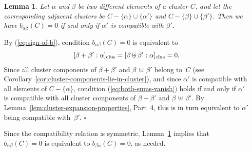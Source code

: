 \documentclass[letterpaper]{amsart}
\numberwithin{equation}{section}
\newtheorem{lemma}[theorem]{Lemma}
\theoremstyle{definition}
\def\proof{\smallskip\noindent {\bf Proof.\ }}
\def\endproof{\hfill$\square$\medskip}
\def\subplus{{\,\uplus\,} }
\begin{document}
\begin{lemma} 
\label{lem:b-vanishing} 
Let $\alpha$ and $\beta$ be two different 
elements of a cluster $C$, and let the corresponding adjacent clusters be 
$C - \{\alpha\} \cup \{\alpha'\}$ and $C - \{\beta\} \cup \{\beta'\}$. 
Then we have $b_{\alpha\beta}(C) = 0$ if and only if 
$\alpha'$ is compatible with $\beta'$. 
\end{lemma} 
 
\proof 
By (\ref{eq:sign-of-b}), condition $b_{\alpha\beta}(C) = 0$ is 
equivalent to 
\begin{equation} 
\label{eq:both-sums-vanish} 
[\beta + \beta': \alpha]_{\rm clus}= 
[\beta \subplus \beta': \alpha]_{\rm clus}=0. 
\end{equation} 
Since all cluster components of $\beta + \beta'$ and 
$\beta \subplus \beta'$ belong to~$C$ 
(see Corollary~\ref{cor:cluster-components-lie-in-cluster}), and since $\alpha'$ is 
compatible with all elements of $C - \{\alpha\}$, 
condition (\ref{eq:both-sums-vanish}) holds if and only if 
 $\alpha'$ is compatible with 
all cluster components of $\beta + \beta'$ and 
$\beta \subplus \beta'$. 
By Lemma~\ref{lem:cluster-expansion-properties}, Part~4, 
this is in turn equivalent to 
$\alpha'$ being compatible with~$\beta'$. 
\endproof 
 
 
Since the compatibility relation is symmetric, Lemma~\ref{lem:b-vanishing} 
implies that \hbox{$b_{\alpha\beta}(C)=0$} is equivalent to $b_{\beta \alpha}(C)=0$, 
as needed. 
 
\end{document}
